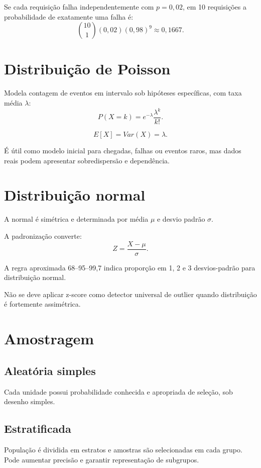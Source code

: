 \begin{exemplo}
Se cada requisição falha independentemente com $p=0{,}02$, em 10 requisições a probabilidade de exatamente uma falha é:
\[
\binom{10}{1}(0{,}02)(0{,}98)^9\approx0{,}1667.
\]
\end{exemplo}

\section{Distribuição de Poisson}

Modela contagem de eventos em intervalo sob hipóteses específicas, com taxa média $\lambda$:
\[
P(X=k)=e^{-\lambda}\frac{\lambda^k}{k!}.
\]

\[
E[X]=Var(X)=\lambda.
\]

É útil como modelo inicial para chegadas, falhas ou eventos raros, mas dados reais podem apresentar sobredispersão e dependência.

\section{Distribuição normal}

A normal é simétrica e determinada por média $\mu$ e desvio padrão $\sigma$.

A padronização converte:
\[
Z=\frac{X-\mu}{\sigma}.
\]

A regra aproximada 68--95--99,7 indica proporção em 1, 2 e 3 desvios-padrão para distribuição normal.

Não se deve aplicar z-score como detector universal de outlier quando distribuição é fortemente assimétrica.

\section{Amostragem}

\subsection{Aleatória simples}

Cada unidade possui probabilidade conhecida e apropriada de seleção, sob desenho simples.

\subsection{Estratificada}

População é dividida em estratos e amostras são selecionadas em cada grupo. Pode aumentar precisão e garantir representação de subgrupos.

